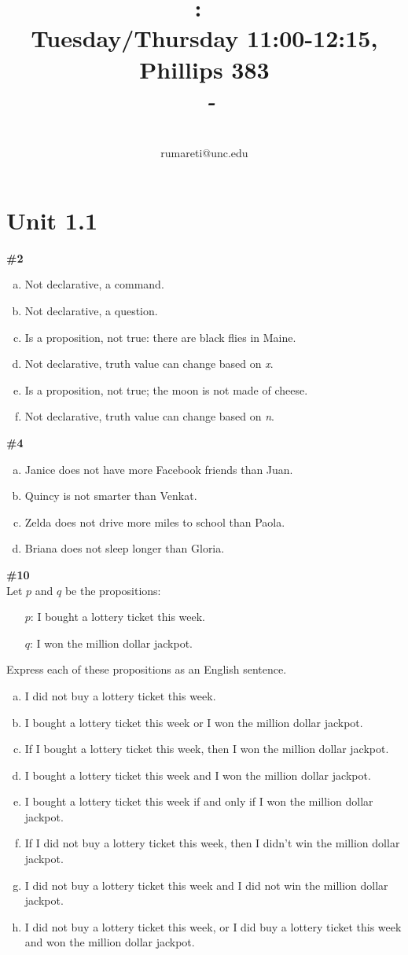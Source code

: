 \documentclass{article}
\title{
    \vspace{2in}
    \textmd{\textbf{\hmwkClass:\ \hmwkTitle}}\\
    \normalsize\vspace{0.1in}\small{Tuesday/Thursday 11:00-12:15, Phillips 383}\\
    \vspace{0.1in}\large{\textit{\hmwkClassInstructor\ - \hmwkClassTime}}
    \vspace{3in}
}
\author{\hmwkAuthorName\\\small{rumareti@unc.edu}}
\date{}
\newcommand{\unit}[1]{\section{Unit #1}}
\newcommand{\problem}[1]{\textbf{\##1}}
\begin{document}
\maketitle

\pagebreak

\unit{1.1}
\problem{2}
\begin{enumerate}[a)]
    \item Not declarative, a command.
    \item Not declarative, a question.
    \item Is a proposition, not true: there are black flies in Maine.
    \item Not declarative, truth value can change based on \emph{x}.
    \item Is a proposition, not true; the moon is not made of cheese.
    \item Not declarative, truth value can change based on \emph{n}.
\end{enumerate}
\problem{4}
\begin{enumerate}[a)]
    \item Janice does not have more Facebook friends than Juan.
    \item Quincy is not smarter than Venkat.
    \item Zelda does not drive more miles to school than Paola.
    \item Briana does not sleep longer than Gloria.
\end{enumerate}
\problem{10}
\\Let \(p\) and \(q\) be the propositions:
\begin{itemize}
    \item[\(p\):]I bought a lottery ticket this week. 
    \item[\(q\):] I won the million dollar jackpot.
\end{itemize}
Express each of these propositions as an English sentence.
\begin{enumerate}[a)]
    \item I did not buy a lottery ticket this week.
    \item I bought a lottery ticket this week or I won the million dollar jackpot.
    \item If I bought a lottery ticket this week, then I won the million dollar jackpot.
    \item I bought a lottery ticket this week and I won the million dollar jackpot.
    \item I bought a lottery ticket this week if and only if I won the million dollar jackpot.
    \item If I did not buy a lottery ticket this week, then I didn't win the million dollar jackpot.
    \item I did not buy a lottery ticket this week and I did not win the million dollar jackpot.
    \item I did not buy a lottery ticket this week, or I did buy a lottery ticket this week and won the million dollar jackpot.
\end{enumerate}
\end{document}
